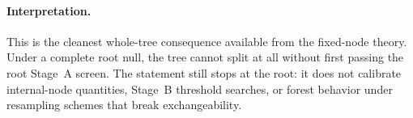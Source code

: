\paragraph{Interpretation.}
This is the cleanest whole-tree consequence available from the fixed-node
theory. Under a complete root null, the tree cannot split at all without first
passing the root Stage~A screen. The statement still stops at the root: it does
not calibrate internal-node quantities, Stage~B threshold searches, or forest
behavior under resampling schemes that break exchangeability.
